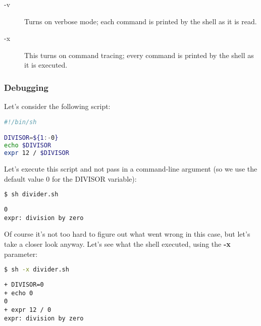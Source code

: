 \begin{description}
	\item[-v] Turns on verbose mode; each command is printed by the shell as it is read.
	\item[-x] This turns on command tracing; every command is printed by the shell as it is executed.
\end{description}

\subsubsection{Debugging}
Let's consider the following script:
\lstset{basicstyle=\scriptsize, numbers=left, captionpos=b, tabsize=4}
\begin{lstlisting}[caption=divider.sh: Script with a potential error,language={bash},
breaklines=true,xleftmargin=15pt,label=lst:divider.sh: Script with a potential error]
#!/bin/sh

DIVISOR=${1:-0}
echo $DIVISOR
expr 12 / $DIVISOR
\end{lstlisting}

Let's execute this script and not pass in a command-line argument (so we use
the default value 0 for the DIVISOR variable):
\lstset{basicstyle=\scriptsize, numbers=left, captionpos=b, tabsize=4}
\begin{lstlisting}[caption=Running the script,language={bash},
breaklines=true,xleftmargin=15pt,label=lst:Running the script]
$ sh divider.sh
\end{lstlisting}

\scriptsize
\begin{verbatim}
0
expr: division by zero
\end{verbatim}
\normalsize

Of course it's not too hard to figure out what went wrong in this case, but
let's take a closer look anyway. Let's see what the shell executed, using the
\textbf{-x} parameter:
\lstset{basicstyle=\scriptsize, numbers=left, captionpos=b, tabsize=4}
\begin{lstlisting}[caption=Running the script with tracing on,language={bash},
breaklines=true,xleftmargin=15pt,label=lst:Running the script with tracing on]
$ sh -x divider.sh
\end{lstlisting}

\scriptsize
\begin{verbatim}
+ DIVISOR=0
+ echo 0
0
+ expr 12 / 0
expr: division by zero
\end{verbatim}
\normalsize

